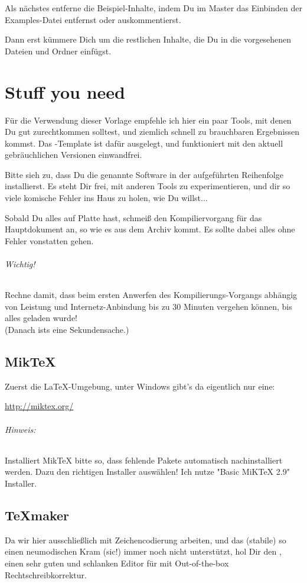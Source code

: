 Als nächstes entferne die Beispiel-Inhalte, indem Du im Master das Einbinden der Examples-Datei entfernst oder auskommentierst.

Dann erst kümmere Dich um die restlichen Inhalte, die Du in die vorgesehenen Dateien und Ordner einfügst.


\chapter{Stuff you need}
\label{kap:stuffuneed}

Für die Verwendung dieser Vorlage empfehle ich hier ein paar Tools, mit denen Du gut zurechtkommen solltest, und ziemlich schnell zu brauchbaren Ergebnissen kommst. Das \zwicktex-Template ist dafür ausgelegt, und funktioniert mit den aktuell gebräuchlichen Versionen einwandfrei.

Bitte sieh zu, dass Du die genannte Software in der aufgeführten Reihenfolge installierst. Es steht Dir frei, mit anderen Tools zu experimentieren, und dir so viele komische Fehler ins Haus zu holen, wie Du willst...

Sobald Du alles auf Platte hast, schmeiß den Kompiliervorgang für das Hauptdokument an, so wie es aus dem Archiv kommt. Es sollte dabei alles ohne Fehler vonstatten gehen.

\subparagraph*{Wichtig!} Rechne damit, dass beim ersten Anwerfen des Kompilierungs-Vorgangs abhängig von Leistung und Internetz-Anbindung bis zu 30 Minuten vergehen können, bis alles geladen wurde! \\
(Danach ists eine Sekundensache.)




\section*{MikTeX}
Zuerst die \LaTeX-Umgebung, unter Windows gibt’s da eigentlich nur eine: 

\url{http://miktex.org/}

\subparagraph*{Hinweis:} Installiert MikTeX bitte so, dass fehlende Pakete automatisch nachinstalliert werden.  Dazu den richtigen Installer auswählen! Ich nutze "Basic MiKTeX 2.9" Installer.




\section*{TeXmaker}
Da wir hier ausschließlich mit  Zeichencodierung arbeiten, und das (stabile)  so einen neumodischen Kram (sic!) immer noch nicht unterstützt, hol Dir den , einen sehr guten und schlanken Editor für \latex mit Out-of-the-box Rechtschreibkorrektur.

